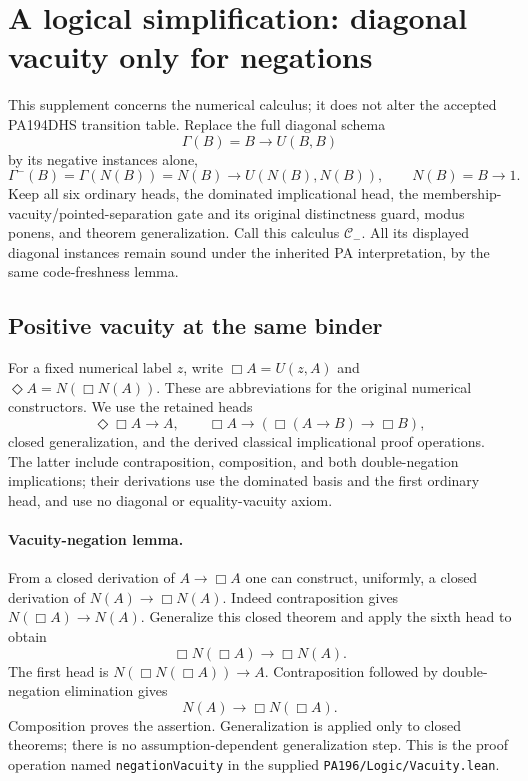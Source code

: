 \section{A logical simplification: diagonal vacuity only for negations}
\label{sec:negative-diagonal}

This supplement concerns the numerical calculus; it does not alter the
accepted PA194DHS transition table. Replace the full diagonal schema
\[
 \Gamma(B)=B\to U(B,B)
\]
by its negative instances alone,
\[
 \Gamma^-(B)=\Gamma(N(B))
       =N(B)\to U(N(B),N(B)),\qquad N(B)=B\to1.
\]
Keep all six ordinary heads, the dominated implicational head, the
membership-vacuity/pointed-separation gate and its original distinctness
guard, modus ponens, and theorem generalization. Call this calculus
$\mathcal C_-$. All its displayed diagonal instances remain sound under
the inherited PA interpretation, by the same code-freshness lemma.

\subsection{Positive vacuity at the same binder}

For a fixed numerical label $z$, write $\Box A=U(z,A)$ and
$\Diamond A=N(\Box N(A))$. These are abbreviations for the original
numerical constructors. We use the retained heads
\[
 \Diamond\Box A\to A,
 \qquad
 \Box A\to(\Box(A\to B)\to\Box B),
\]
closed generalization, and the derived classical implicational proof
operations. The latter include contraposition, composition, and both
double-negation implications; their derivations use the dominated basis
and the first ordinary head, and use no diagonal or equality-vacuity axiom.

\paragraph{Vacuity-negation lemma.}
From a closed derivation of $A\to\Box A$ one can construct, uniformly,
a closed derivation of $N(A)\to\Box N(A)$.
Indeed contraposition gives
$N(\Box A)\to N(A)$. Generalize this closed theorem and apply the sixth
head to obtain
\[
 \Box N(\Box A)\to\Box N(A).
\]
The first head is $N(\Box N(\Box A))\to A$. Contraposition followed by
double-negation elimination gives
\[
 N(A)\to\Box N(\Box A).
\]
Composition proves the assertion. Generalization is applied only to
closed theorems; there is no assumption-dependent generalization step.
This is the proof operation named \texttt{negationVacuity} in the supplied
\texttt{PA196/Logic/Vacuity.lean}.

